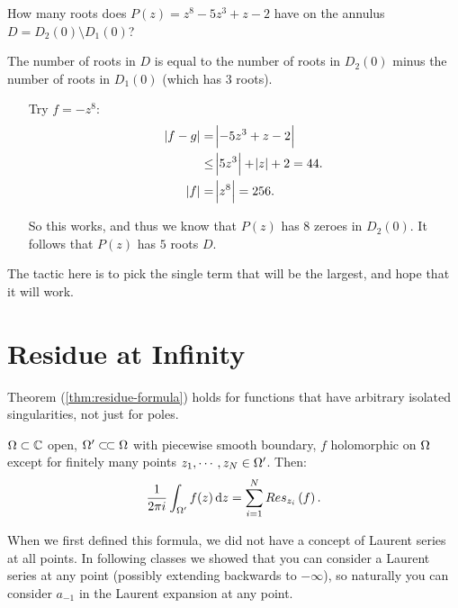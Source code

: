 \begin{example}
How many roots does $P(z) = z^8-5z^3+z-2$ have on the annulus $D=D_2(0) \setminus D_1(0)$?

The number of roots in $D$ is equal to the number of roots in $D_2(0)$ minus the number of roots in $D_1(0)$ (which has $3$ roots).


\begin{enumerate}
    \item[Try] $f=-z^8$:
    \begin{align*}
        \abs{f-g} &= \abs{-5z^3+z-2}\\
        &\leq \abs{5z^3} + \abs{z} +2 = 44.\\
        \abs{f} &= \abs{z^8} = 256.
    \end{align*}
    
    So this works, and thus we know that $P(z)$ has $8$ zeroes in $D_2(0)$. It follows that $P(z)$ has $5$ roots $D$.

\end{enumerate}


\end{example}

\begin{note}

The tactic here is to pick the single term that will be the largest, and hope that it will work.

\end{note}




\section{Residue at Infinity}

\begin{remark}
Theorem (\ref{thm:residue-formula}) holds for functions that have arbitrary isolated singularities, not just for poles.
\end{remark}

\begin{theorem}\label{thm:residue-formula2}
$\Omega \subset \mathbb{C}$ open, $\om ' \ssubset \om$ with piecewise smooth boundary, $f$ holomorphic on $\Omega$ except for finitely many points $z_1, \cdots , z_N \in \Omega '$. Then:
\begin{align*}
    \frac{1}{2 \pi i} \int_{\om '} f(z) \dif z = \sum_{i=1}^N \res{z_i}{f}.
\end{align*}
\end{theorem}
\begin{note}
When we first defined this formula, we did not have a concept of Laurent series at all points. In following classes we showed that you can consider a Laurent series at any point (possibly extending backwards to $- \infty$), so naturally you can consider $a_{-1}$ in the Laurent expansion at any point.
\end{note}

